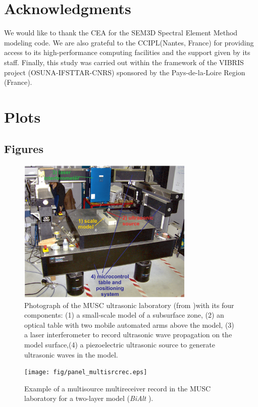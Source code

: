 \documentclass[manuscript,revised]{geophysics}
\newcommand{\bialt}{\textit{BiAlt} }
\begin{document}
\section*{Acknowledgments}

\noindent We would like to thank the CEA for the SEM3D Spectral Element Method modeling code. We are also grateful to the CCIPL(Nantes, France) for providing access to its high-performance computing facilities and the support given  by its staff. Finally, this study was carried out within the framework of the VIBRIS project (OSUNA-IFSTTAR-CNRS) sponsored by the Pays-de-la-Loire Region (France). 

\section{Plots}

\subsection*{Figures}

\begin{figure}[!h]
\centering
\includegraphics[width=0.75\textwidth]{fig/panel_musc_bench.eps}
\caption{Photograph of the MUSC ultrasonic laboratory (from \citet{Bretaudeau_FWI_2013} )with its four components: (1) a small-scale model of a subsurface zone, (2) an optical table with two mobile automated arms above the model, (3) a laser interferometer to record ultrasonic wave propagation on the model surface,(4) a piezoelectric ultrasonic source to generate ultrasonic waves in the model.}
\label{panel_musc_bench}
\end{figure}

\begin{figure}[!h]
\centering
\texttt{[image: fig/panel\_multisrcrec.eps]}
\caption{Example of a multisource multireceiver record in the MUSC laboratory for a two-layer model (\bialt).}
\label{panel_multisrcrec}
\end{figure}
\end{document}
